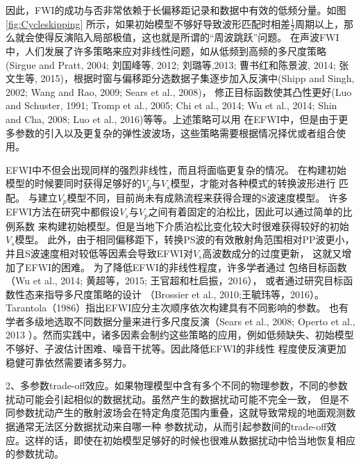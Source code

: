因此，FWI的成功与否非常依赖于长偏移距记录和数据中有效的低频分量。如图\ref{fig:Cycleskipping}
所示，如果初始模型不够好导致波形匹配时相差$\frac{1}{2}$周期以上，那么就会使得反演陷入局部极值，这也就是所谓的“周波跳跃”问题。
在声波FWI中，人们发展了许多策略来应对非线性问题，如从低频到高频的多尺度策略(Sirgue and
Pratt, 2004\cite{sirgue.pratt:2004}; 刘国峰等, 2012\cite{刘国峰2012};
刘璐等,2013\cite{刘璐2013}; 曹书红和陈景波, 2014\cite{曹书红2014}; 
张文生等, 2015\cite{张文生2015})，根据时窗与偏移距分选数据子集逐步加入反演中(Shipp and
Singh, 2002\cite{shipp:2002}; Wang and Rao, 2009\cite{WangEtAl2009}; Sears et al., 2008\cite{sears2008})，
修正目标函数使其凸性更好(Luo and Schuster, 1991\cite{luo1991}; Tromp et al.,
2005\cite{tromp2005seismic}; Chi
et al., 2014\cite{ChiEtAl2014}; Wu et al., 2014\cite{Wu2014b}; Shin and Cha,
2008\cite{shin.cha:2008}; Luo et al., 2016\cite{Luo2016})等等。上述策略可以用
在EFWI中，但是由于更多参数的引入以及更复杂的弹性波波场，这些策略需要根据情况择优或者组合使用。

EFWI中不但会出现同样的强烈非线性，而且将面临更复杂的情况。
在构建初始模型的时候要同时获得足够好的$V_p$与$V_s$模型，才能对各种模式的转换波形进行
匹配。
与建立$V_p$模型不同，目前尚未有成熟流程来获得合理的S波速度模型。
许多EFWI方法在研究中都假设$V_s$与$V_p$之间有着固定的泊松比，因此可以通过简单的比例系数
来构建初始模型。但是当地下介质泊松比变化较大时很难获得较好的初始$V_s$模型。
此外，由于相同偏移距下，转换PS波的有效散射角范围相对PP波更小，并且S波速度相对较低等因素会导致EFWI对$V_s$高波数成分的过度更新，
这就又增加了EFWI的困难。
为了降低EFWI的非线性程度，许多学者通过
包络目标函数（Wu et al., 2014\cite{Wu2014b}; 黄超等，2015\cite{黄超2015};
王官超和杜启振，2016\cite{王官超2016}），
或者通过研究目标函数性态来指导多尺度策略的设计
（Brossier et al., 2010\cite{BrossierEtAl2010};王毓玮等，2016\cite{王毓玮2016}）。
Tarantola（1986）\cite{tarantola:1986}指出EFWI应分主次顺序依次构建具有不同影响的参数。
也有学者多级地选取不同数据分量来进行多尺度反演（Sears et al., 2008\cite{sears2008}; Operto et al., 2013
\cite{operto2013guided}）。然而实践中，诸多因素会制约这些策略的应用，例如低频缺失、初始模型不够好、子波估计困难、噪音干扰等。因此降低EFWI的非线性
程度使反演更加稳健可靠依然需要诸多努力。

2、多参数trade-off效应。如果物理模型中含有多个不同的物理参数，不同的参数扰动可能会引起相似的数据扰动。虽然产生的数据扰动可能不完全一致，
但是不同参数扰动产生的散射波场会在特定角度范围内重叠，这就导致常规的地面观测数据通常无法区分数据扰动来自哪一种
参数扰动，从而引起参数间的trade-off效应。这样的话，即使在初始模型足够好的时候也很难从数据扰动中恰当地恢复相应的参数扰动。

